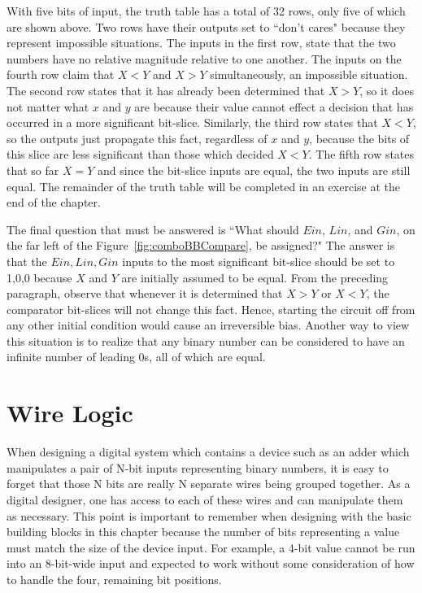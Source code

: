     With five bits of input, the truth table has a total of 32 rows, only
    five of which are shown above.  Two rows have their outputs set to
    ``don't cares" because they represent impossible situations.  The inputs
    in the first row, state that the two numbers have no relative
    magnitude relative to one another.  The inputs on the fourth row
    claim that $X<Y$ and $X>Y$ simultaneously, an impossible situation.
    The second row states that it has already been determined that $X>Y$,
    so it does not matter what $x$ and $y$ are because their value cannot
    effect a decision that has occurred
    in a more significant bit-slice.  Similarly, the third row states
    that $X<Y$, so the outputs just propagate this fact, regardless
    of $x$ and $y$, because the bits of this slice are less significant
    than those which decided $X<Y$.  The fifth row states that
    so far $X=Y$ and since the bit-slice inputs are equal, the
    two inputs are still equal.  The remainder of the truth table will
    be completed in an exercise at the end of the chapter.

    The final question that must be answered is ``What should $Ein$, $Lin$,
    and $Gin$, on the far left of the Figure~\ref{fig:comboBBCompare}, be assigned?"
    The answer is that the $Ein, Lin,Gin$ inputs to the most significant bit-slice
    should be set to 1,0,0 because $X$ and $Y$ are initially assumed to be equal.
    From the preceding paragraph, observe that whenever it is determined
    that $X>Y$ or $X<Y$, the comparator bit-slices will not change this
    fact.  Hence, starting the circuit off from any other initial condition
    would cause an irreversible bias.  Another way to view this situation
    is to realize that any binary number can be considered to have an infinite
    number of leading 0s, all of which are equal.

\section{Wire Logic}
    When  designing a digital system which contains a device
    such as an adder which manipulates a pair of N-bit inputs representing
    binary numbers, it is easy to forget that those N bits are really
    N separate wires being grouped together.  As a
    digital designer, one has access to each of these wires
    and can manipulate them as necessary.  This point is important
    to remember when designing with the basic building
    blocks in this chapter because the number of bits representing a
    value must match the size of the device input.  For example,
    a 4-bit value cannot be run into an 8-bit-wide input and
    expected to work without some consideration of how to
    handle the four, remaining bit positions.

